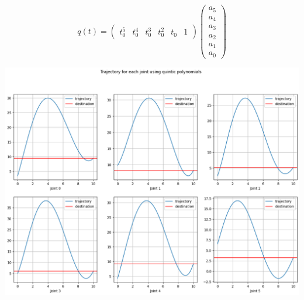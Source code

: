 $$q(t) = \begin{pmatrix}
    t_0^5 & t_0^4 & t_0^3 & t_0^2 & t_0 & 1
\end{pmatrix}
\begin{pmatrix}
    a_5 \\ a_4 \\ a_3 \\ a_2 \\ a_1 \\ a_0
\end{pmatrix}
$$

\includegraphics[width=\linewidth]{images/trajectory_polynomial.png}